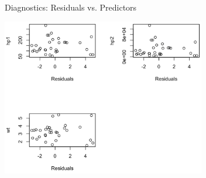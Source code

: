 \begin{frame}{Diagnostics: Residuals vs. Predictors}
    \begin{center}
        \includegraphics[width=3.5in]{images/mtcarsresidpred.png}
    \end{center}
\end{frame}
